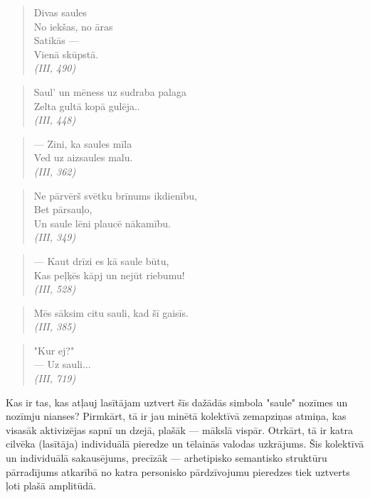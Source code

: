\documentclass[11pt]{article}
\begin{document}
\begin{quote}
Divas saules\\
No iekšas, no āras\\
Satikās ---\\
Vienā skūpstā.\\
{\em (III, 490)}
\end{quote}

\begin{quote}
Saul' un mēness uz sudraba palaga\\
Zelta gultā kopā gulēja..\\
{\em (III, 448)}
\end{quote}

\begin{quote}
--- Zini, ka saules mīla\\
Ved uz aizsaules malu.\\
{\em (III, 362)}
\end{quote}

\begin{quote}
Ne pārvērš svētku brīnums ikdienību,\\
Bet pārsauļo,\\
Un saule lēni plaucē nākamību.\\
{\em (III, 349)}
\end{quote}

\begin{quote}
--- Kaut drīzi es kā saule būtu,\\
Kas peļķēs kāpj un nejūt riebumu!\\
{\em (III, 528)}
\end{quote}

\begin{quote}
Mēs sāksim citu sauli, kad šī gaisīs.\\
{\em (III, 385)}
\end{quote}

\begin{quote}
"Kur ej?"\\
--- Uz sauli...\\
{\em (III, 719)}
\end{quote}

Kas ir tas, kas atļauj lasītājam uztvert
šīs dažādās simbola "saule" nozīmes un
nozīmju nianses? Pirmkārt, tā ir jau minētā
kolektīvā zemapziņas atmiņa, kas visasāk
aktivizējas sapnī un dzejā, plašāk --- mākslā
vispār. Otrkārt, tā ir katra cilvēka (lasītāja)
individuālā pieredze un tēlainās valodas
uzkrājums. Šis kolektīvā un individuālā
sakausējums, precīzāk --- arhetipisko semantisko
struktūru pārradījums atkarībā no katra personisko
pārdzīvojumu pieredzes tiek uztverts ļoti plašā
amplitūdā.
\end{document}
